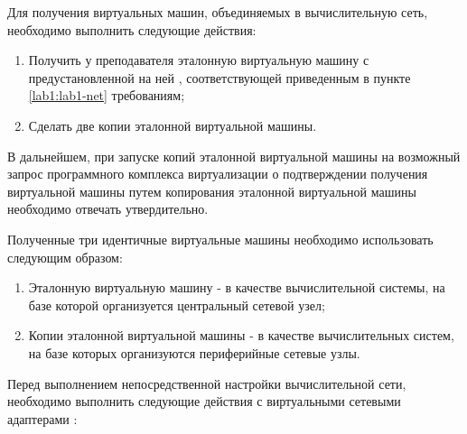 	Для получения виртуальных машин, объединяемых в вычислительную сеть, необходимо выполнить следующие действия:

	\begin{enumerate}

		\item Получить у преподавателя эталонную виртуальную машину с предустановленной на ней \linux, соответствующей
		приведенным в пункте \ref{lab1:lab1-net} требованиям;

		\item Сделать две копии эталонной виртуальной машины.

	\end{enumerate}

	В дальнейшем, при запуске копий эталонной виртуальной машины на возможный запрос программного комплекса виртуализации о
	подтверждении получения виртуальной машины путем копирования эталонной виртуальной машины необходимо отвечать утвердительно.

	Полученные три идентичные виртуальные машины необходимо использовать следующим образом:

	\begin{enumerate}

		\item Эталонную виртуальную машину - в качестве вычислительной системы, на базе которой организуется
		центральный сетевой узел;

		\item Копии эталонной виртуальной машины - в качестве вычислительных систем, на базе которых
		организуются периферийные сетевые узлы.

	\end{enumerate}

	Перед выполнением непосредственной настройки вычислительной сети, необходимо выполнить следующие действия с виртуальными сетевыми адаптерами \virtpo:

